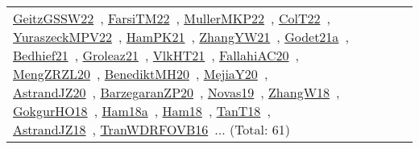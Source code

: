 {\begin{longtable}{lp{3cm}>{\raggedright\arraybackslash}p{6cm}>{\raggedright\arraybackslash}p{6cm}>{\raggedright\arraybackslash}p{8cm}}
\href{../works/GeitzGSSW22.pdf}{GeitzGSSW22}~\cite{GeitzGSSW22}, \href{../works/FarsiTM22.pdf}{FarsiTM22}~\cite{FarsiTM22}, \href{../works/MullerMKP22.pdf}{MullerMKP22}~\cite{MullerMKP22}, \href{../works/ColT22.pdf}{ColT22}~\cite{ColT22}, \href{../works/YuraszeckMPV22.pdf}{YuraszeckMPV22}~\cite{YuraszeckMPV22}, \href{../works/HamPK21.pdf}{HamPK21}~\cite{HamPK21}, \href{../works/ZhangYW21.pdf}{ZhangYW21}~\cite{ZhangYW21}, \href{../works/Godet21a.pdf}{Godet21a}~\cite{Godet21a}, \href{../works/Bedhief21.pdf}{Bedhief21}~\cite{Bedhief21}, \href{../works/Groleaz21.pdf}{Groleaz21}~\cite{Groleaz21}, \href{../works/VlkHT21.pdf}{VlkHT21}~\cite{VlkHT21}, \href{../works/FallahiAC20.pdf}{FallahiAC20}~\cite{FallahiAC20}, \href{../works/MengZRZL20.pdf}{MengZRZL20}~\cite{MengZRZL20}, \href{../works/BenediktMH20.pdf}{BenediktMH20}~\cite{BenediktMH20}, \href{../works/MejiaY20.pdf}{MejiaY20}~\cite{MejiaY20}, \href{../works/AstrandJZ20.pdf}{AstrandJZ20}~\cite{AstrandJZ20}, \href{../works/BarzegaranZP20.pdf}{BarzegaranZP20}~\cite{BarzegaranZP20}, \href{../works/Novas19.pdf}{Novas19}~\cite{Novas19}, \href{../works/ZhangW18.pdf}{ZhangW18}~\cite{ZhangW18}, \href{../works/GokgurHO18.pdf}{GokgurHO18}~\cite{GokgurHO18}, \href{../works/Ham18a.pdf}{Ham18a}~\cite{Ham18a}, \href{../works/Ham18.pdf}{Ham18}~\cite{Ham18}, \href{../works/TanT18.pdf}{TanT18}~\cite{TanT18}, \href{../works/AstrandJZ18.pdf}{AstrandJZ18}~\cite{AstrandJZ18}, \href{../works/TranWDRFOVB16.pdf}{TranWDRFOVB16}~\cite{TranWDRFOVB16}... (Total: 61)\\

\end{longtable}}
